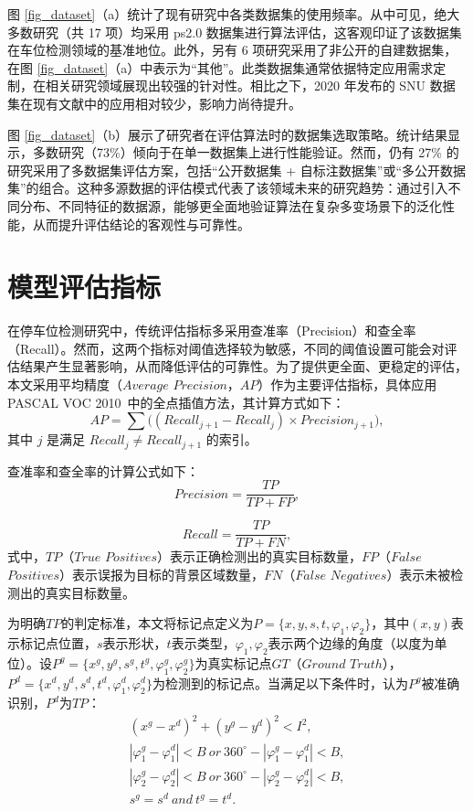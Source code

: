 图 \ref{fig_dataset}（a）统计了现有研究中各类数据集的使用频率。从中可见，绝大多数研究（共 17 项）均采用 ps2.0 数据集进行算法评估，这客观印证了该数据集在车位检测领域的基准地位。此外，另有 6 项研究采用了非公开的自建数据集，在图 \ref{fig_dataset}（a）中表示为“其他”。此类数据集通常依据特定应用需求定制，在相关研究领域展现出较强的针对性。相比之下，2020 年发布的 SNU 数据集在现有文献中的应用相对较少，影响力尚待提升。


图 \ref{fig_dataset}（b）展示了研究者在评估算法时的数据集选取策略。统计结果显示，多数研究（73\%）倾向于在单一数据集上进行性能验证。然而，仍有 27\% 的研究采用了多数据集评估方案，包括“公开数据集 + 自标注数据集”或“多公开数据集”的组合。这种多源数据的评估模式代表了该领域未来的研究趋势：通过引入不同分布、不同特征的数据源，能够更全面地验证算法在复杂多变场景下的泛化性能，从而提升评估结论的客观性与可靠性。

\section{模型评估指标}

在停车位检测研究中，传统评估指标多采用查准率（Precision）和查全率（Recall）。然而，这两个指标对阈值选择较为敏感，不同的阈值设置可能会对评估结果产生显著影响，从而降低评估的可靠性。为了提供更全面、更稳定的评估，本文采用平均精度（$Average$ $Precision$，$AP$）作为主要评估指标，具体应用 PASCAL VOC 2010~\cite{everingham2010pascal}中的全点插值方法，其计算方式如下：
\begin{equation}
AP = \sum \Big((Recall_{j+1}-Recall_{j}) \times Precision_{j+1} \Big),
\end{equation}
其中 $j$ 是满足 $Recall_{j} \neq Recall_{j+1}$ 的索引。

查准率和查全率的计算公式如下：
\begin{equation}
Precision = \frac{TP}{TP + FP},
\end{equation}

\begin{equation}
Recall = \frac{TP}{TP + FN},
\end{equation}
式中，$TP$（$True$ $Positives$）表示正确检测出的真实目标数量，$FP$（$False$ $Positives$）表示误报为目标的背景区域数量，$FN$（$False$ $Negatives$）表示未被检测出的真实目标数量。

为明确$TP$的判定标准，本文将标记点定义为$P=\{x, y, s, t, \varphi_{1}, \varphi_{2}\}$，其中$(x, y)$表示标记点位置，$s$表示形状，$t$表示类型，$\varphi_{1}, \varphi_{2}$表示两个边缘的角度（以度为单位）。设$P^{g}=\{x^{g}, y^{g}, s^{g}, t^{g}, \varphi_{1}^{g}, \varphi_{2}^{g}\}$为真实标记点$GT$（$Ground$ $Truth$），$P^{d}=\{x^{d}, y^{d}, s^{d}, t^{d}, \varphi_{1}^{d}, \varphi_{2}^{d}\}$为检测到的标记点。当满足以下条件时，认为$P^{g}$被准确识别，$P^{d}$为$TP$：
  \begin{align}
  (x^{g}-x^{d})^{2} + (y^{g}-y^{d})^{2} < I^{2}, \\
|\varphi_{1}^{g} - \varphi_{1}^{d}| < B \ or \ 360^{\circ} - |\varphi_{1}^{g} - \varphi_{1}^{d}| < B , \\
|\varphi_{2}^{g} - \varphi_{2}^{d}| < B \ or \ 360^{\circ} - |\varphi_{2}^{g} - \varphi_{2}^{d}| < B , \\
s^{g} = s^{d} \ and \ t^{g} = t^{d}.
\end{align}


